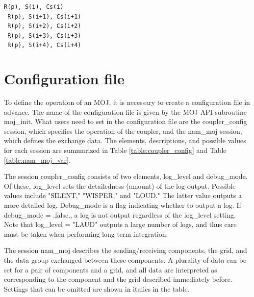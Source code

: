 \documentclass[11pt,a4paper]{report}
\newcommand{\tabref}[1]{Table \ref{#1}}
\begin{document}
\begin{lstlisting}[caption=Example of mapping table, label=list:mapping_table_sample]
 R(p), S(i), Cs(i)
 R(p), S(i+1), Cs(i+1)
 R(p), S(i+2), Cs(i+2)
 R(p), S(i+3), Cs(i+3)
 R(p), S(i+4), Cs(i+4)
\end{lstlisting}

\section{Configuration file}
To define the operation of an MOJ, it is necessary to create a configuration file in advance. 
The name of the configuration file is given by the MOJ API subroutine moj\_init. 
What users need to set in the configuration file are the coupler\_config session, which specifies the operation of the coupler, and the nam\_moj session, which defines the exchange data.
The elements, descriptions, and possible values for each session are summarized in \tabref{table:coupler_config} and \tabref{table:nam_moj_var}.

The session coupler\_config consists of two elements, log\_level and debug\_mode. 
Of these, log\_level sets the detailedness (amount) of the log output. Possible values include "SILENT," "WISPER," and "LOUD." 
The latter value outputs a more detailed log. 
Debug\_mode is a flag indicating whether to output a log. 
If debug\_mode = .false., a log is not output regardless of the log\_level setting.
Note that log\_level = "LAUD" outputs a large number of logs, and thus care must be taken when performing long-term integration.

The session nam\_moj describes the sending/receiving components, the grid, and the data group exchanged between these components.
A plurality of data can be set for a pair of components and a grid, and all data are interpreted as corresponding to the component and the grid described immediately before.
Settings that can be omitted are shown in italics in the table.
\end{document}
